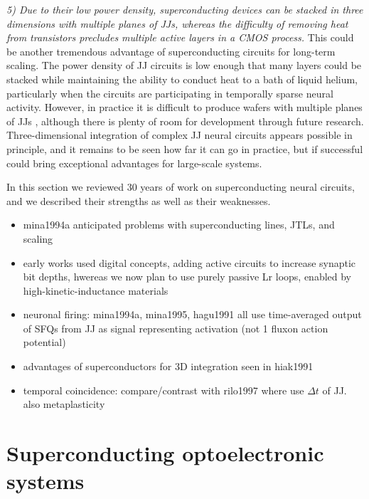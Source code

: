 \documentclass[twocolumn]{article}
\begin{document}
\vspace{1em}
\textit{5) Due to their low power density, superconducting devices can be stacked in three dimensions with multiple planes of JJs, whereas the difficulty of removing heat from transistors precludes multiple active layers in a CMOS process.} \newline This could be another tremendous advantage of superconducting circuits for long-term scaling. The power density of JJ circuits is low enough that many layers could be stacked while maintaining the ability to conduct heat to a bath of liquid helium, particularly when the circuits are participating in temporally sparse neural activity. However, in practice it is difficult to produce wafers with multiple planes of JJs \cite{to2016}, although there is plenty of room for development through future research. Three-dimensional integration of complex JJ neural circuits appears possible in principle, and it remains to be seen how far it can go in practice, but if successful could bring exceptional advantages for large-scale systems.

\vspace{1em}
In this section we reviewed 30 years of work on superconducting neural circuits, and we described their strengths as well as their weaknesses. 

\vspace{1em}
\begin{itemize}
\item mina1994a anticipated problems with superconducting lines, JTLs, and scaling
\item early works used digital concepts, adding active circuits to increase synaptic bit depths, hwereas we now plan to use purely passive Lr loops, enabled by high-kinetic-inductance materials
\item neuronal firing: mina1994a, mina1995, hagu1991 all use time-averaged output of SFQs from JJ as signal representing activation (not 1 fluxon action potential)
\item advantages of superconductors for 3D integration seen in hiak1991
\item temporal coincidence: compare/contrast with rilo1997 where use $\Delta t$ of JJ. also metaplasticity
\end{itemize}

\section{\label{sec:superconducting_optoelectronic}Superconducting optoelectronic systems}
\end{document}
